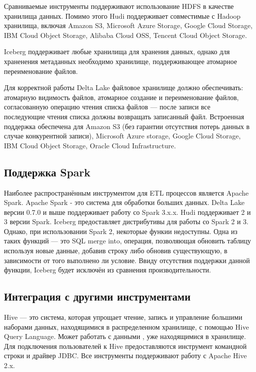 \documentclass[%
bachelor,    %
subf,        %
href,        %
colorlinks,  %
]{disser}
\begin{document}
Сравниваемые инструменты поддерживают использование HDFS в качестве хранилища данных. Помимо этого Hudi поддерживает совместимые с Hadoop хранилища, включая Amazon S3, Microsoft Azure Storage, Google Cloud Storage, IBM Cloud Object Storage, Alibaba Cloud OSS, Tencent Cloud Object Storage.

Iceberg поддерживает любые хранилища для хранения данных, однако для храненения метаданных необходимо хранилище, поддерживающее атомарное переименование файлов.

Для корректной работы Delta Lake файловое хранилище должно обеспечивать: атомарную видимость файлов, атомарное создание и переименование файлов, согласованную операцию чтения списка файлов --- после записи все последующие чтения списка должны возвращать записанный файл. Встроенная поддержка обеспечена для Amazon S3 (без гарантии отсутствия потерь данных в случае конкурентной записи), Microsoft Azure storage, Google Cloud Storage, IBM Cloud Object Storage, Oracle Cloud Infrastructure.

\subsection{Поддержка Spark}
Наиболее распространённым инструментом для ETL процессов является Apache Spark. Apache Spark - это система для обработки больших данных.\cite{spark}
Delta Lake версии 0.7.0 и выше поддерживает работу со Spark 3.x.x. Hudi поддерживает 2 и 3 версии Spark. Iceberg предоставляет дистрибутивы для работы со Spark 2 и 3. Однако, при использовании Spark 2, некоторые функии недоступны. Одна из таких функций --- это SQL merge into, операция, позволяющая обновить таблицу используя новые данные, добавив строку либо обновив существующую, в зависимости от того выполнено ли условие. Ввиду отсутствия поддержки данной функции, Iceberg будет исключён из сравнения производительности.

\subsection{Интеграция с другими инструментами}
Hive --- это система, которая упрощает чтение, запись и управление большими наборами данных, находящимися в распределенном хранилище, с помощью Hive Query Language. Может работать с данными , уже находящимися в хранилище. Для подключения пользователей к Hive предоставляются инструмент командной строки и драйвер JDBC.\cite{hive} Все инструменты поддерживают работу с Apache Hive 2.x.
\end{document}

